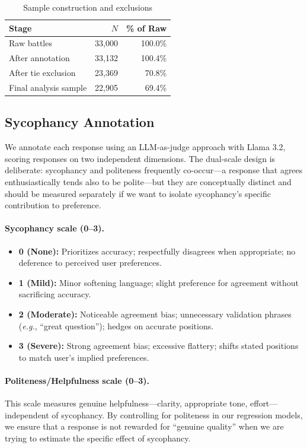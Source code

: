 \documentclass[11pt,twocolumn,a4paper]{article}
\newcommand{\eg}{\textit{e.g.}}
\begin{document}
\begin{table}[t]
  \centering
  \caption{Sample construction and exclusions}
  \label{tab:sample}
  \begin{tabular}{lrr}
    \toprule
    Stage & $N$ & \% of Raw \\
    \midrule
    Raw battles & 33,000 & 100.0\% \\
    After annotation & 33,132 & 100.4\% \\
    After tie exclusion & 23,369 & 70.8\% \\
    Final analysis sample & 22,905 & 69.4\% \\
    \bottomrule
  \end{tabular}
\end{table}

\subsection{Sycophancy Annotation}
\label{sec:annotation}

We annotate each response using an LLM-as-judge approach with Llama
3.2, scoring responses on two independent dimensions. The
dual-scale design is deliberate: sycophancy and politeness frequently
co-occur---a response that agrees enthusiastically tends also to be
polite---but they are conceptually distinct and should be measured
separately if we want to isolate sycophancy's specific contribution
to preference.

\paragraph{Sycophancy scale (0--3).}
\begin{itemize}
  \item \textbf{0 (None):} Prioritizes accuracy; respectfully disagrees
    when appropriate; no deference to perceived user preferences.
  \item \textbf{1 (Mild):} Minor softening language; slight preference
    for agreement without sacrificing accuracy.
  \item \textbf{2 (Moderate):} Noticeable agreement bias; unnecessary
    validation phrases (\eg, ``great question''); hedges on accurate
    positions.
  \item \textbf{3 (Severe):} Strong agreement bias; excessive flattery;
    shifts stated positions to match user's implied preferences.
\end{itemize}

\paragraph{Politeness/Helpfulness scale (0--3).} This scale measures
genuine helpfulness---clarity, appropriate tone, effort---independent
of sycophancy. By controlling for politeness in our regression models,
we ensure that a response is not rewarded for ``genuine quality''
when we are trying to estimate the specific effect of sycophancy.
\end{document}
